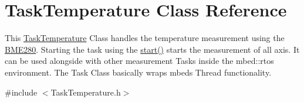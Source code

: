 \hypertarget{class_task_temperature}{}\section{Task\+Temperature Class Reference}
\label{class_task_temperature}


This \hyperlink{class_task_temperature}{Task\+Temperature} Class handles the temperature measurement using the \hyperlink{class_b_m_e280}{B\+M\+E280}. Starting the task using the \hyperlink{class_task_temperature_ada8c9d103caa02964b57fcf61d7baca5}{start()} starts the measurement of all axis. It can be used alongside with other measurement Tasks inside the mbed\+::rtos environment. The Task Class basically wraps mbeds Thread functionality.  




{\ttfamily \#include $<$Task\+Temperature.\+h$>$}

